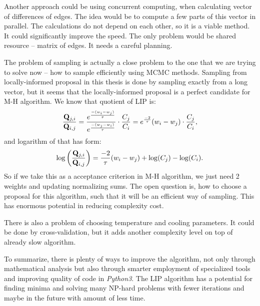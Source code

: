 	Another approach could be using concurrent computing, when calculating vector of differences of edges. The idea would be to compute a few parts of this vector in parallel. The calculations do not depend on each other, so it is a viable method. It could significantly improve the speed. The only problem would be shared resource  -- matrix of edges. It needs a careful planning.
	
	The problem of sampling is actually a close problem to the one that we are trying to solve now -- how to sample efficiently using MCMC methods. Sampling from locally-informed proposal in this thesis is done by sampling exactly from a long vector, but it seems that the locally-informed proposal is a perfect candidate for M-H algorithm. We know that quotient of LIP is:
	\begin{equation*}
		\frac{\mathbf{Q}_{j,i}}{\mathbf{Q}_{i,j}} = \frac{e^\frac{-(w_{i} - w_j)}{\tau}}{e^\frac{-(w_{j} - w_i)}{\tau}} \cdot \frac{C_j}{C_i} =  e^\frac{-2}{\tau}(w_{i} - w_j) \cdot \frac{C_j}{C_i},
	\end{equation*}
	and logarithm of that has form:
	\begin{equation*}
		\log\left(\frac{\mathbf{Q}_{j,i}}{\mathbf{Q}_{i,j}}\right)  = \frac{-2}{\tau}(w_{i} - w_j) + \log(C_j) - \log(C_i).
	\end{equation*}
	So if we take this as a acceptance criterion in M-H algorithm, we just need 2 weights and updating normalizing sums. The open question is, how to choose a proposal for this algorithm, such that it will be an efficient way of sampling. This has enormous potential in reducing complexity cost.
	
	There is also a problem of choosing temperature and cooling parameters. It could be done by cross-validation, but it adds another complexity level on top of already slow algorithm.
	
	To summarize, there is plenty of ways to improve the algorithm, not only through mathematical analysis but also through smarter employment of specialized tools and improving quality of code in \textit{Python3}. The LIP algorithm has a potential for finding minima and solving many NP-hard problems with fewer iterations and maybe in the future with amount of less time.